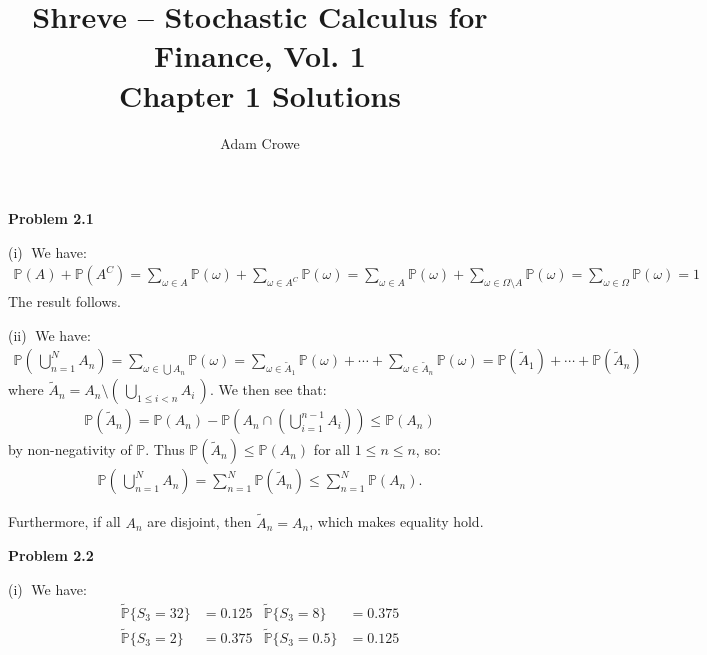 \documentclass[12pt, letterpaper]{article}
\author{Adam Crowe}
\title{Shreve -- Stochastic Calculus for Finance, Vol. 1 \\ Chapter 1 Solutions}
\begin{document}
\maketitle

\vspace{5mm}
\noindent
\textbf{Problem 2.1}

\vspace{5mm}
\noindent
(i)$\;$ We have:
\begin{gather*}
    \mathbb P(A) + \mathbb P(A^C) =
    \sum_{\omega \in A} \mathbb P(\omega) + \sum_{\omega \in A^C} \mathbb P(\omega)=
    \sum_{\omega \in A} \mathbb P(\omega) + \sum_{\omega \in \Omega \setminus A} \mathbb P(\omega)
    = \sum_{\omega \in \Omega} \mathbb P(\omega) = 1
\end{gather*}
The result follows.

\rightline{$\square$}

\vspace{5mm}
\noindent
(ii)$\;$ We have:
\begin{gather*}
    \mathbb P \left( \, \bigcup_{n=1}^N A_n \right)
    = \sum_{\omega \in \bigcup A_n} \mathbb P(\omega)
    = \sum_{\omega \in \tilde A_1} \mathbb P(\omega)
    + \cdots
    +\sum_{\omega \in \tilde A_n } \mathbb P(\omega)
    = \mathbb P(\tilde A_1) + \cdots + \mathbb P(\tilde A_n)
\end{gather*}
where $\tilde A_n = A_n \setminus \left( \, \bigcup_{1 \leq i < n} A_i \, \right)$.
We then see that:
\begin{gather*}
    \mathbb P(\tilde A_n) = \mathbb P(A_n) - \mathbb P\left( A_n \cap \left(\bigcup_{i=1}^{n-1} A_i \right) \right)
    \leq \mathbb P(A_n)
\end{gather*}
by non-negativity of $\mathbb P$.
Thus $\mathbb P(\tilde A_n) \leq \mathbb P(A_n)$ for all $1 \leq n \leq n$, so:
\begin{gather*}
    \mathbb P \left( \, \bigcup_{n=1}^N A_n \right)
    = \sum_{n=1}^N \mathbb P(\tilde A_n) \leq \sum_{n=1}^N \mathbb P(A_n).
\end{gather*}

\vspace{5mm}
Furthermore, if all $A_n$ are disjoint, then $\tilde A_n = A_n$, which makes equality hold.

\rightline{$\square$}

\vspace{5mm}
\noindent
\textbf{Problem 2.2} $\;$ 

\vspace{5mm}
\noindent
(i)$\;$ We have:
\begin{align*}
    \tilde{\mathbb P} \{ S_3 = 32 \} &= 0.125 & \tilde{\mathbb P} \{ S_3 = 8 \} &= 0.375 \\
    \tilde{\mathbb P} \{ S_3 = 2 \} &= 0.375 & \tilde{\mathbb P} \{ S_3 = 0.5 \} &= 0.125
\end{align*}
\end{document}
